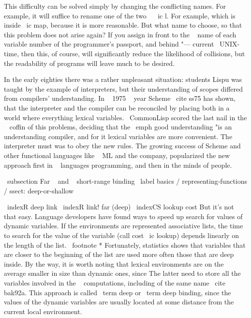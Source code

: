 {{This difficulty can be solved simply by changing the conflicting names. For example,
it will suffice to rename one of the two ~ \ ic {l}. For example,
which is inside \ ic {map}, because it is more reasonable. But what name to choose,
so that this problem does not arise again? If you assign in front to the ~ name of each
variable number of the programmer's passport, and behind "--- current \ UNIX- time, then
this, of course, will significantly reduce the likelihood of collisions, but the readability of programs
will leave much to be desired.

In the early eighties there was a rather unpleasant situation: students
Lispu was taught by the example of interpreters, but their understanding of scopes
differed from compilers' understanding. In ~ 1975 ~ year Scheme \ cite {ss75} has shown,
that the interpreter and the compiler can be reconciled by placing both in a world where everything
lexical variables. { \ CommonLisp } scored the last nail in the ~ coffin of this
problems, deciding that the \ emph {good} understanding "is an understanding
compiler, and for it lexical variables are more convenient. The interpreter must
was to obey the new rules. The growing success of Scheme and other functional
languages ​​like ~ ML and the company, popularized the new approach first in ~ languages
programming, and then in the minds of people.


\ subsection {Far ~ and ~ short-range binding} %
\ label {basics / representing-functions / ssect: deep-or-shallow}

\ indexR {deep link}
\ indexR {link! far (deep)}
\ indexCS {lookup} {cost}
But it's not that easy. Language developers have found ways to speed up
search for values ​​of dynamic variables. If the environments are represented
associative lists, the time to search for the value of the variable (call cost
\ ic {lookup}) depends linearly on the length of the list. \ footnote * {Fortunately, statistics
shows that variables that are closer to the beginning of the list are used
more often those that are deep inside. By the way, it is worth noting that
lexical environments are on the average smaller in size than dynamic ones, since
The latter need to store all the variables involved in the ~ computations, including
of the same name \ cite {bak92a}.} This approach is called \ term {deep} or
\ term {deep binding}, since the values ​​of the dynamic
variables are usually located at some distance from the current local
environment.

}}
